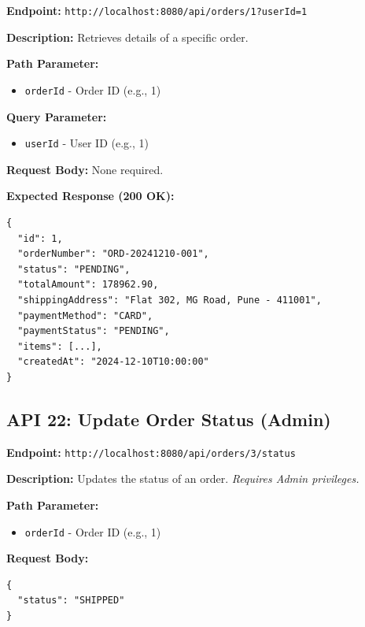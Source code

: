 \documentclass[12pt, a4paper]{article}
\begin{document}
\begin{tcolorbox}[colback=getcolor!10, colframe=getcolor, title=GET]
\textbf{Endpoint:} \texttt{http://localhost:8080/api/orders/1?userId=1}
\end{tcolorbox}

\textbf{Description:} Retrieves details of a specific order.

\textbf{Path Parameter:}
\begin{itemize}
    \item \texttt{orderId} - Order ID (e.g., 1)
\end{itemize}

\textbf{Query Parameter:}
\begin{itemize}
    \item \texttt{userId} - User ID (e.g., 1)
\end{itemize}

\textbf{Request Body:} None required.

\textbf{Expected Response (200 OK):}
\begin{lstlisting}
{
  "id": 1,
  "orderNumber": "ORD-20241210-001",
  "status": "PENDING",
  "totalAmount": 178962.90,
  "shippingAddress": "Flat 302, MG Road, Pune - 411001",
  "paymentMethod": "CARD",
  "paymentStatus": "PENDING",
  "items": [...],
  "createdAt": "2024-12-10T10:00:00"
}
\end{lstlisting}

\vspace{0.5cm}

\subsection{API 22: Update Order Status (Admin)}

\begin{tcolorbox}[colback=putcolor!10, colframe=putcolor, title=PUT]
\textbf{Endpoint:} \texttt{http://localhost:8080/api/orders/3/status}
\end{tcolorbox}

\textbf{Description:} Updates the status of an order. \textit{Requires Admin privileges.}

\textbf{Path Parameter:}
\begin{itemize}
    \item \texttt{orderId} - Order ID (e.g., 1)
\end{itemize}

\textbf{Request Body:}
\begin{lstlisting}
{
  "status": "SHIPPED"
}
\end{lstlisting}
\end{document}

